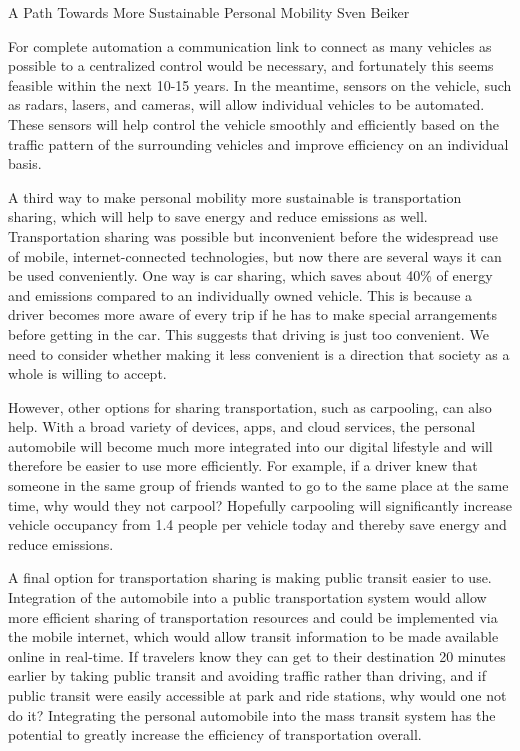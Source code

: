 \documentclass[10pt]{papertex}
\begin{document}
\begin{news}{2}{A Path Towards More Sustainable Personal Mobility}{
    Sven Beiker}{}{}

For complete automation a communication link to connect as many vehicles as 
possible to a centralized control would be necessary, and fortunately this 
seems feasible within the next 10-15 years. In the meantime, sensors on the 
vehicle, such as radars, lasers, and cameras, will allow individual vehicles 
to be automated. These sensors will help control the vehicle smoothly and 
efficiently based on the traffic pattern of the surrounding vehicles and 
improve efficiency on an individual basis.

A third way to make personal mobility more sustainable is transportation 
sharing, which will help to save energy and reduce emissions as well. 
Transportation sharing was possible but inconvenient before the widespread 
use of mobile, internet-connected technologies, but now there are several ways 
it can be used conveniently. One way is car sharing, which saves about 40\% of 
energy and emissions compared to an individually owned vehicle. This is 
because a driver becomes more aware of every trip if he has to make special 
arrangements before getting in the car. This suggests that driving is just too 
convenient. We need to consider whether making it less convenient is a 
direction that society as a whole is willing to accept.

However, other options for sharing transportation, such as carpooling, can 
also help. With a broad variety of devices, apps, and cloud services, the 
personal automobile will become much more integrated into our digital 
lifestyle and will therefore be easier to use more efficiently. For example, 
if a driver knew that someone in the same group of friends wanted to go to the 
same place at the same time, why would they not carpool? Hopefully carpooling 
will significantly increase vehicle occupancy from 1.4 people per vehicle today 
and thereby save energy and reduce emissions.

A final option for transportation sharing is making public transit easier to 
use. Integration of the automobile into a public transportation system would 
allow more efficient sharing of transportation resources and could be 
implemented via the mobile internet, which would allow transit information to 
be made available online in real-time. If travelers know they can get to their 
destination 20 minutes earlier by taking public transit and avoiding traffic 
rather than driving, and if public transit were easily accessible at park and 
ride stations, why would one not do it? Integrating the personal automobile 
into the mass transit system has the potential to greatly increase the 
efficiency of transportation overall.


\end{news}
\end{document}
